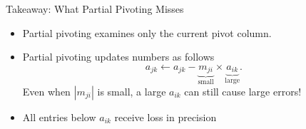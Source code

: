 \documentclass[10pt]{beamer}
\begin{document}
\begin{frame}{Takeaway: What Partial Pivoting Misses}

\begin{itemize}
    \item Partial pivoting examines only the current
    pivot column.
        \vfill
    \item Partial pivoting updates numbers as follows
    \[
        a_{jk}\leftarrow a_{jk}-\underbrace{m_{ji}}_{\text{small}} \times \underbrace{a_{ik}}_{\text{large}}.
    \]
    Even when $|m_{ji}|$ is small, a large $a_{ik}$ can still cause large errors! 
        \vfill 
    \item All entries below $a_{ik}$ receive loss in precision
\end{itemize}


\end{frame}
\end{document}

